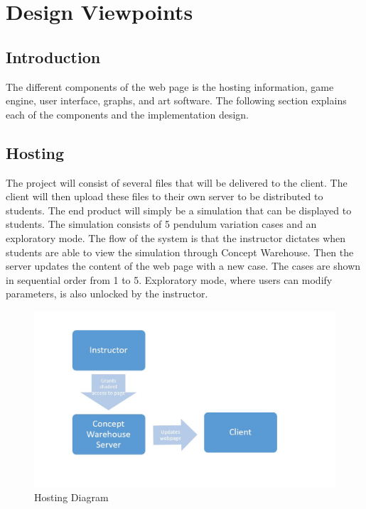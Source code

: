 \documentclass[onecolumn, draftclsnofoot,10pt, compsoc]{IEEEtran}
\begin{document}


\section{Design Viewpoints}

\subsection{Introduction}
The different components of the web page is the hosting information, game engine, user interface, graphs, and art software. The following section explains each of the components and the implementation design. 
\subsection{Hosting}
The project will consist of several files that will be delivered to the client. The client will then upload these files to their own server to be distributed to students. The end product will simply be a simulation that can be displayed to students.
The simulation consists of 5 pendulum variation cases and an exploratory mode. The flow of the system is that the instructor dictates when students are able to view the simulation through Concept Warehouse. Then the server updates the content of the web page with a new case. The cases are shown in sequential order from 1 to 5. Exploratory mode, where users can modify parameters, is also unlocked by the instructor. 

\begin{figure}[H]
  \includegraphics[width=6.5 in]{hosting_diagram.jpg}
  \caption{Hosting Diagram}
  \label{fig:host}
\end{figure}
\end{document}

